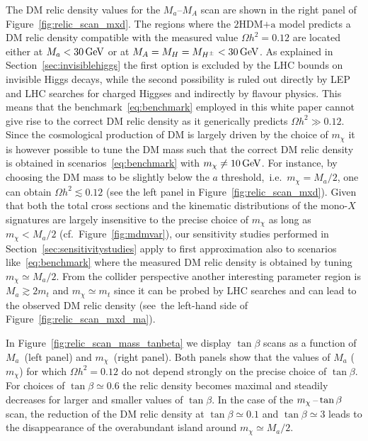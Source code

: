 \documentclass[a4paper, 11pt,notoc]{article}
\newcommand{\mA}{\ensuremath{M_{A}}\xspace}
\newcommand{\ma}{\ensuremath{M_{a}}\xspace}
\newcommand{\mH}{\ensuremath{M_{H}}\xspace}
\newcommand{\mHc}{\ensuremath{M_{H^{\pm}}}\xspace}
\newcommand{\hdma}{\ensuremath{\textrm{2HDM+a}}\xspace}
\begin{document}
 The DM relic density values for the $\ma$--$\mA$ scan  are shown in the right panel of Figure~\ref{fig:relic_scan_mxd}. The regions where the \hdma model predicts a DM relic density compatible with the measured value $\Omega h^{2} = 0.12$ are located either at $\ma < 30 \, {\rm GeV}$ or at $\mA=\mH=\mHc < 30 \, {\rm GeV}$. As explained in Section~\ref{sec:invisiblehiggs} the first option is excluded by the LHC bounds on invisible Higgs decays, while the second possibility is ruled out directly by LEP and LHC searches for charged Higgses and indirectly by flavour physics. This means that the benchmark~\eqref{eq:benchmark} employed in this white paper cannot give rise to the correct DM relic density as it generically predicts $\Omega h^{2} \gg 0.12$.  Since the cosmological production of DM is largely driven by the choice of $m_\chi$ it is however possible to tune the DM mass such that the correct DM relic density is obtained in scenarios~\eqref{eq:benchmark} with $m_\chi \neq 10 \, {\rm GeV}$.  For instance, by choosing the DM mass to be slightly below the $a$ threshold,~i.e.~$m_\chi = \ma/2$, one can obtain $\Omega h^{2} \lesssim 0.12$ (see the left panel in Figure~\ref{fig:relic_scan_mxd}). Given that both the total cross sections and the kinematic distributions of the mono-$X$ signatures are largely insensitive to the precise choice of $m_\chi$ as long as $m_\chi < \ma/2$ (cf.~Figure~\ref{fig:mdmvar}), our sensitivity studies performed in Section~\ref{sec:sensitivitystudies} apply to first approximation also to scenarios like~\eqref{eq:benchmark} where the measured DM relic density is obtained by tuning $ m_\chi \simeq \ma/2$. From the collider perspective another interesting parameter region is $M_a \gtrsim  2 m_t$ and $m_\chi \simeq m_t$ since it can be probed by LHC searches and can lead to the observed DM relic density (see~the left-hand side of Figure~\ref{fig:relic_scan_mxd_ma}).  

 In Figure~\ref{fig:relic_scan_mass_tanbeta} we display $\tan \beta$ scans as a function of $\ma$~(left panel) and $m_\chi$~(right panel). Both panels show that the values of $\ma$ ($m_\chi$) for which $\Omega h^{2} = 0.12$ do not depend strongly on the precise choice of $\tan \beta$. For choices of $\tan \beta \simeq 0.6$ the relic density becomes maximal and steadily decreases for larger and smaller values of $\tan \beta$. In the case of the $m_\chi \hspace{0.5mm}$--$\hspace{0.5mm} \tan \beta$ scan, the reduction of the DM relic density at $\tan \beta \simeq 0.1$ and $\tan \beta \simeq 3$  leads to the disappearance of the overabundant island around $m_\chi\simeq\ma/2$.
 
\end{document}
